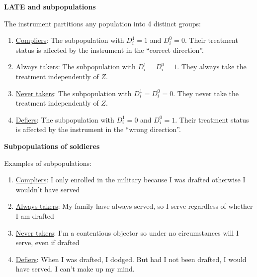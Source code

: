 \documentclass[notes=show]{beamer}
\begin{document}
\begin{frame}[plain]	

	\begin{center}
	\textbf{LATE and subpopulations}
	\end{center}
	
The instrument partitions any population into 4 distinct groups:
		\begin{enumerate}
		\item \underline{Compliers}: The subpopulation with $D_i^1=1$ and $D_i^0=0$. Their treatment status is affected by the instrument in the ``correct direction''.
		\item \underline{Always takers}: The subpopulation with $D^1_{i}=D^0_{i}=1$. They always take the treatment independently of $Z$.
		\item \underline{Never takers}: The subpopulation with $D^1_{i}=D^0_{i}=0$. They never take the treatment independently of $Z$.
		\item \underline{Defiers}: The subpopulation with $D^1_{i}=0$ and $D^0_{i}=1$. Their treatment status is affected by the instrument in the ``wrong direction''.
		\end{enumerate}
\end{frame}

\begin{frame}[plain]	

	\begin{center}
	\textbf{Subpopulations of soldieres}
	\end{center}
	
Examples of subpopulations:
		\begin{enumerate}
		\item \underline{Compliers}: I only enrolled in the military because I was drafted otherwise I wouldn't have served
		\item \underline{Always takers}: My family have always served, so I serve regardless of whether I am drafted
		\item \underline{Never takers}: I'm a contentious objector so under no circumstances will I serve, even if drafted
		\item \underline{Defiers}: When I was drafted, I dodged. But had I not been drafted, I would have served. I can't make up my mind.
		\end{enumerate}
\end{frame}
\end{document}
